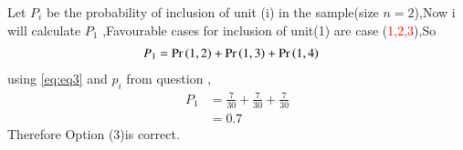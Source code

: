 \documentclass[journal,12pt,twocolumn]{IEEEtran}
\begin{document}
\begin{table}[h!]
  \caption{ list of samples}
  \label{tab:label1_test}
\end{table}
Let $P_{i}$ be the probability of inclusion of unit (i) in the sample(size $n=2$),Now i will calculate $P_{1}$ ,Favourable cases for inclusion of unit(1) are case (\textcolor{red}{1,2,3}),So
\begin{align}
    P_{1}&=\Pr\left(1,2\right) +\Pr\left(1,3\right)+\Pr\left(1,4\right)
\end{align}
using \eqref{eq:eq3} and $p_{i}$ from question ,
\begin{align}
    P_{1}&=\frac{7}{30} + \frac{7}{30} + \frac{7}{30}
    \\
    &=0.7
\end{align}
Therefore Option (3)is correct.
\end{document}
